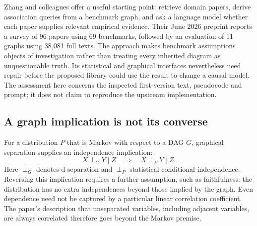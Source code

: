 Zhang and colleagues offer a useful starting point: retrieve domain papers,
derive association queries from a benchmark graph, and ask a language model
whether each paper supplies relevant empirical evidence. Their June 2026
preprint reports a survey of 96 papers using 69 benchmarks, followed by an
evaluation of 11 graphs using 38,081 full texts. The approach makes benchmark
assumptions objects of investigation rather than treating every inherited
diagram as unquestionable truth. Its statistical and graphical interfaces
nevertheless need repair before the proposed library could use the result to
change a causal model. The assessment here concerns the inspected first-version
text, pseudocode and prompt; it does not claim to reproduce the upstream
implementation.~\citep{exec17_benchmark_consistency}

\subsection{A graph implication is not its converse}

For a distribution $P$ that is Markov with respect to a DAG $G$, graphical
separation supplies an independence implication:
\begin{equation}
 X\perp_G Y\mid Z \quad\Longrightarrow\quad X\perp_P Y\mid Z.
\label{exec17:validity-markov}
\end{equation}
Here $\perp_G$ denotes d-separation and $\perp_P$ statistical conditional
independence. Reversing this implication requires a further assumption, such
as faithfulness: the distribution has no extra independences beyond those
implied by the graph. Even dependence need not be captured by a particular
linear correlation coefficient. The paper's description that unseparated
variables, including adjacent variables, are always correlated therefore goes
beyond the Markov premise.~\citep{exec17_benchmark_consistency}

